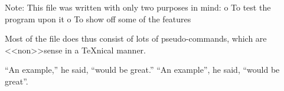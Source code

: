 Note: This file was written with only two purposes in mind:
    o To test the program upon it
    o To show off some of the features

Most of the file does thus consist of lots of pseudo-commands, which
are <<non>>sense in a TeXnical manner.


``An example,'' he said, ``would be great.''
``An example'', he said, ``would be great''.
